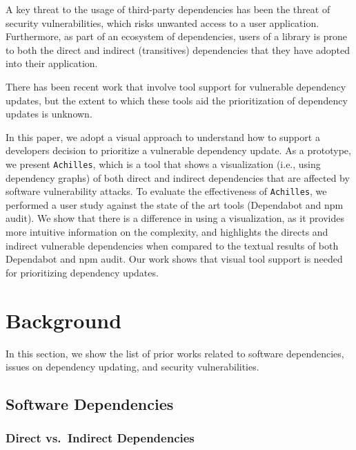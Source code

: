 \documentclass[conference]{IEEEtran}
\begin{document}
	A key threat to the usage of third-party dependencies has been the threat of security vulnerabilities, which risks unwanted access to a user application. 
	Furthermore, as part of an ecosystem of dependencies, users of a library is prone to both the direct and indirect (transitives) dependencies that they have adopted into their application. 
	
	There has been recent work that involve tool support for vulnerable dependency updates, but the extent to which these tools aid the prioritization of dependency updates is unknown. 
	
	In this paper, we adopt a visual approach to understand how to support a developers decision to prioritize a vulnerable dependency update.
	As a prototype, we present \texttt{Achilles}, which is a tool that shows a visualization (i.e., using dependency graphs) of both direct and indirect dependencies that are affected by software vulnerability attacks.
		To evaluate the effectiveness of \texttt{Achilles}, we performed a user study against the state of the art tools (Dependabot and npm audit). 
		We show that there is a difference in using a visualization, as it provides more intuitive information on the complexity, and highlights the directs and indirect vulnerable dependencies when compared to the textual results of both Dependabot and npm audit.
		Our work shows that  visual tool support is needed for prioritizing dependency updates. 
	
	\section{Background}
	In this section, we show the list of prior works related to software dependencies, issues on dependency updating, and security vulnerabilities.
	\subsection{Software Dependencies}
	\subsubsection{Direct vs.~Indirect Dependencies}
\end{document}
